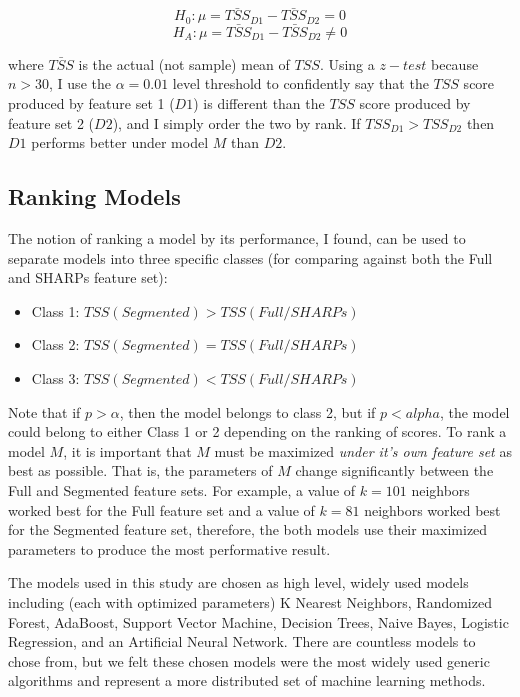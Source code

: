 $$H_0: \mu = \bar{TSS}_{D1} - \bar{TSS}_{D2} = 0$$
$$H_A: \mu = \bar{TSS}_{D1} - \bar{TSS}_{D2} \neq 0$$

where $\bar{TSS}$ is the actual (not sample) mean of $TSS$. Using a $z-test$ because $n > 30$, I use the $\alpha = 0.01$ level threshold to confidently say that the $TSS$ score produced by feature set 1 ($D1$) is different than the $TSS$ score produced by feature set 2 ($D2$), and I simply order the two by rank. If $TSS_{D1} > TSS_{D2}$ then $D1$ performs better under model $M$ than $D2$. 

\subsection{Ranking Models}

The notion of ranking a model by its performance, I found, can be used to separate models into three specific classes (for comparing against both the Full and SHARPs feature set):

\begin{itemize}
    \item Class 1: $TSS(Segmented) > TSS(Full / SHARPs)$
    \item Class 2: $TSS(Segmented) = TSS(Full / SHARPs)$
    \item Class 3: $TSS(Segmented) < TSS(Full / SHARPs)$
\end{itemize}

Note that if $p > \alpha$, then the model belongs to class 2, but if $p < alpha$, the model could belong to either Class 1 or 2 depending on the ranking of scores. To rank a model $M$, it is important that $M$ must be maximized \textit{under it's own feature set} as best as possible. That is, the parameters of $M$ change significantly between the Full and Segmented feature sets. For example, a value of $k = 101$ neighbors worked best for the Full feature set and a value of $k = 81$ neighbors worked best for the Segmented feature set, therefore, the both models use their maximized parameters to produce the most performative result.

The models used in this study are chosen as high level, widely used models including (each with optimized parameters) K Nearest Neighbors, Randomized Forest, AdaBoost, Support Vector Machine, Decision Trees, Naive Bayes, Logistic Regression, and an Artificial Neural Network. There are countless models to chose from, but we felt these chosen models were the most widely used generic algorithms and represent a more distributed set of machine learning methods.




